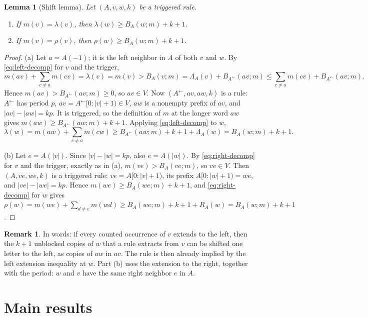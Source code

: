 \documentclass[11pt]{article}
\numberwithin{equation}{section}
\newtheorem{lemma}[theorem]{Lemma}
\theoremstyle{definition}
\newtheorem{remark}[theorem]{Remark}
\newcommand{\len}[1]{\lvert #1\rvert}
\newcommand{\lsh}[1]{#1^{\leftarrow}}
\begin{document}
\begin{lemma}[Shift lemma]\label{lem:shift}
Let $(A,v,w,k)$ be a triggered rule.
\begin{enumerate}[label=\textup{(\alph*)}]
\item If $m(v)=\lambda(v)$, then $\lambda(w)\ge B_A(w;m)+k+1$.
\item If $m(v)=\rho(v)$, then $\rho(w)\ge B_A(w;m)+k+1$.
\end{enumerate}
\end{lemma}

\begin{proof}
(a) Let $a=A(-1)$; it is the left neighbor in $A$ of both $v$ and $w$. By
\eqref{eq:left-decomp} for $v$ and the trigger,
\[
m(av)+\sum_{c\ne a}m(cv)=\lambda(v)=m(v)>B_A(v;m)
=\Lambda_A(v)+B_{\lsh A}(av;m)\le\sum_{c\ne a}m(cv)+B_{\lsh A}(av;m).
\]
Hence $m(av)>B_{\lsh A}(av;m)\ge0$, so $av\in V$. Now
$(\lsh A,av,aw,k)$ is a rule: $\lsh A$ has period $p$,
$av=\lsh A[0:\len v+1)\in V$, $aw$ is a nonempty prefix of $av$, and
$\len{av}-\len{aw}=kp$. It is triggered, so the definition of $m$ at the
longer word $aw$ gives $m(aw)\ge B_{\lsh A}(aw;m)+k+1$. Applying
\eqref{eq:left-decomp} to $w$,
\[
\lambda(w)=m(aw)+\sum_{c\ne a}m(cw)\ge B_{\lsh A}(aw;m)+k+1+\Lambda_A(w)
=B_A(w;m)+k+1.
\]

(b) Let $e=A(\len v)$. Since $\len v-\len w=kp$, also $e=A(\len w)$. By
\eqref{eq:right-decomp} for $v$ and the trigger, exactly as in (a),
$m(ve)>B_A(ve;m)$, so $ve\in V$. Then $(A,ve,we,k)$ is a triggered rule:
$ve=A[0:\len v+1)$, its prefix $A[0:\len w+1)=we$, and
$\len{ve}-\len{we}=kp$. Hence $m(we)\ge B_A(we;m)+k+1$, and
\eqref{eq:right-decomp} for $w$ gives
$\rho(w)=m(we)+\sum_{d\ne e}m(wd)\ge B_A(we;m)+k+1+R_A(w)=B_A(w;m)+k+1$.
\end{proof}

\begin{remark}
In words: if every counted occurrence of $v$ extends to the left, then the
$k+1$ unblocked copies of $w$ that a rule extracts from $v$ can be shifted one
letter to the left, as copies of $aw$ in $av$. The rule is then already
implied by the left extension inequality at $w$. Part (b) uses the extension
to the right, together with the period: $w$ and $v$ have the same right
neighbor $e$ in $A$.
\end{remark}

\section{Main results}
\end{document}
